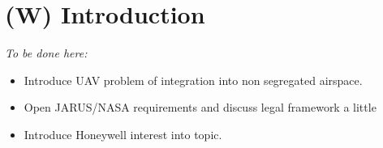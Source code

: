 \cleardoublepage
\chapter{(W) Introduction}\label{ch:introduction}
    \emph{To be done here:}
    \begin{itemize}
        \item Introduce UAV problem of integration into non segregated airspace.
        \item Open JARUS/NASA requirements and discuss legal framework a little
        \item Introduce Honeywell interest into topic.
    \end{itemize}